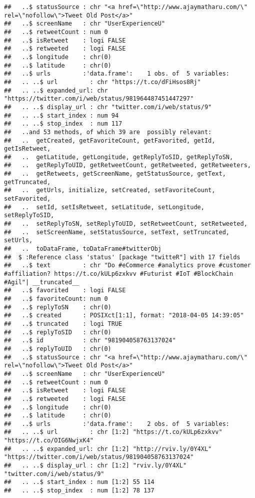 \documentclass[]{article}
\begin{document}
\begin{verbatim}
##   ..$ statusSource : chr "<a href=\"http://www.ajaymatharu.com/\" rel=\"nofollow\">Tweet Old Post</a>"
##   ..$ screenName   : chr "UserExperienceU"
##   ..$ retweetCount : num 0
##   ..$ isRetweet    : logi FALSE
##   ..$ retweeted    : logi FALSE
##   ..$ longitude    : chr(0) 
##   ..$ latitude     : chr(0) 
##   ..$ urls         :'data.frame':    1 obs. of  5 variables:
##   .. ..$ url         : chr "https://t.co/dFiHsos8Rj"
##   .. ..$ expanded_url: chr "https://twitter.com/i/web/status/981964487451447297"
##   .. ..$ display_url : chr "twitter.com/i/web/status/9"
##   .. ..$ start_index : num 94
##   .. ..$ stop_index  : num 117
##   ..and 53 methods, of which 39 are  possibly relevant:
##   ..  getCreated, getFavoriteCount, getFavorited, getId, getIsRetweet,
##   ..  getLatitude, getLongitude, getReplyToSID, getReplyToSN,
##   ..  getReplyToUID, getRetweetCount, getRetweeted, getRetweeters,
##   ..  getRetweets, getScreenName, getStatusSource, getText, getTruncated,
##   ..  getUrls, initialize, setCreated, setFavoriteCount, setFavorited,
##   ..  setId, setIsRetweet, setLatitude, setLongitude, setReplyToSID,
##   ..  setReplyToSN, setReplyToUID, setRetweetCount, setRetweeted,
##   ..  setScreenName, setStatusSource, setText, setTruncated, setUrls,
##   ..  toDataFrame, toDataFrame#twitterObj
##  $ :Reference class 'status' [package "twitteR"] with 17 fields
##   ..$ text         : chr "Do #eCommerce #analytics prove #customer #affiliation? https://t.co/kULp6zxkvv #Futurist #IoT #BlockChain #Agil"| __truncated__
##   ..$ favorited    : logi FALSE
##   ..$ favoriteCount: num 0
##   ..$ replyToSN    : chr(0) 
##   ..$ created      : POSIXct[1:1], format: "2018-04-05 14:39:05"
##   ..$ truncated    : logi TRUE
##   ..$ replyToSID   : chr(0) 
##   ..$ id           : chr "981904058763137024"
##   ..$ replyToUID   : chr(0) 
##   ..$ statusSource : chr "<a href=\"http://www.ajaymatharu.com/\" rel=\"nofollow\">Tweet Old Post</a>"
##   ..$ screenName   : chr "UserExperienceU"
##   ..$ retweetCount : num 0
##   ..$ isRetweet    : logi FALSE
##   ..$ retweeted    : logi FALSE
##   ..$ longitude    : chr(0) 
##   ..$ latitude     : chr(0) 
##   ..$ urls         :'data.frame':    2 obs. of  5 variables:
##   .. ..$ url         : chr [1:2] "https://t.co/kULp6zxkvv" "https://t.co/OIG6NwjxK4"
##   .. ..$ expanded_url: chr [1:2] "http://rviv.ly/0Y4XL" "https://twitter.com/i/web/status/981904058763137024"
##   .. ..$ display_url : chr [1:2] "rviv.ly/0Y4XL" "twitter.com/i/web/status/9"
##   .. ..$ start_index : num [1:2] 55 114
##   .. ..$ stop_index  : num [1:2] 78 137

\end{verbatim}
\end{document}
